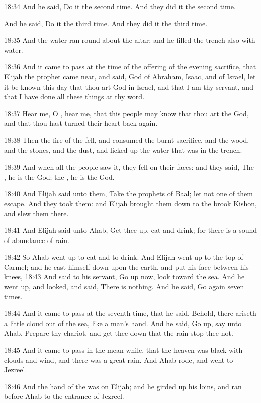 18:34 And he said, Do it the second time. And they did it the second
time.

And he said, Do it the third time. And they did it the third time.

18:35 And the water ran round about the altar; and he filled the
trench also with water.

18:36 And it came to pass at the time of the offering of the evening
sacrifice, that Elijah the prophet came near, and said, \LORD God of
Abraham, Isaac, and of Israel, let it be known this day that thou art
God in Israel, and that I am thy servant, and that I have done all
these things at thy word.

18:37 Hear me, O \LORD, hear me, that this people may know that thou
art the \LORD God, and that thou hast turned their heart back again.

18:38 Then the fire of the \LORD fell, and consumed the burnt
sacrifice, and the wood, and the stones, and the dust, and licked up
the water that was in the trench.

18:39 And when all the people saw it, they fell on their faces: and
they said, The \LORD, he is the God; the \LORD, he is the God.

18:40 And Elijah said unto them, Take the prophets of Baal; let not
one of them escape. And they took them: and Elijah brought them down
to the brook Kishon, and slew them there.

18:41 And Elijah said unto Ahab, Get thee up, eat and drink; for there
is a sound of abundance of rain.

18:42 So Ahab went up to eat and to drink. And Elijah went up to the
top of Carmel; and he cast himself down upon the earth, and put his
face between his knees, 18:43 And said to his servant, Go up now, look
toward the sea. And he went up, and looked, and said, There is
nothing. And he said, Go again seven times.

18:44 And it came to pass at the seventh time, that he said, Behold,
there ariseth a little cloud out of the sea, like a man's hand. And he
said, Go up, say unto Ahab, Prepare thy chariot, and get thee down
that the rain stop thee not.

18:45 And it came to pass in the mean while, that the heaven was black
with clouds and wind, and there was a great rain. And Ahab rode, and
went to Jezreel.

18:46 And the hand of the \LORD was on Elijah; and he girded up his
loins, and ran before Ahab to the entrance of Jezreel.

